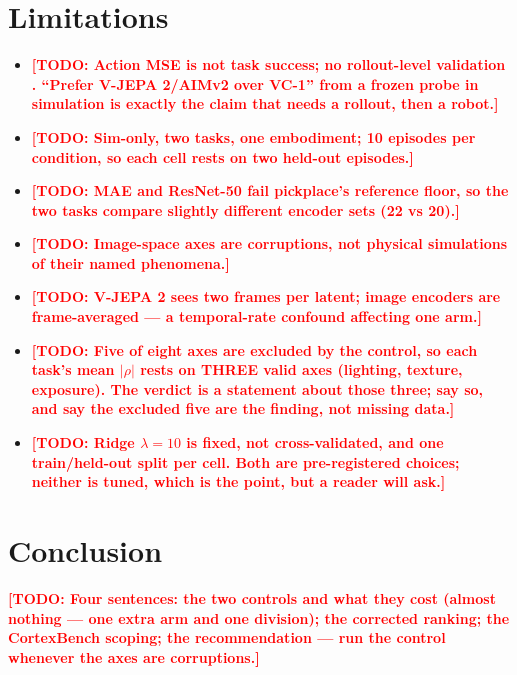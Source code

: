 \documentclass[10pt]{article}
\newcommand{\TODO}[1]{\textcolor{red}{\textbf{[TODO: #1]}}}
\newcommand{\rrho}{\rho}
\begin{document}
\section{Limitations}
\label{sec:limitations}
\begin{itemize}
  \item \TODO{Action MSE is not task success; no rollout-level validation
  \citep{criticalmse2026}. ``Prefer V-JEPA 2/AIMv2 over VC-1'' from a frozen
  probe in simulation is exactly the claim that needs a rollout, then a
  robot.}
  \item \TODO{Sim-only, two tasks, one embodiment; 10 episodes per condition,
  so each cell rests on two held-out episodes.}
  \item \TODO{MAE and ResNet-50 fail pickplace's reference floor, so the two
  tasks compare slightly different encoder sets (22 vs 20).}
  \item \TODO{Image-space axes are corruptions, not physical simulations of
  their named phenomena.}
  \item \TODO{V-JEPA 2 sees two frames per latent; image encoders are
  frame-averaged --- a temporal-rate confound affecting one arm.}
  \item \TODO{Five of eight axes are excluded by the control, so each task's
  mean $|\rrho|$ rests on THREE valid axes (lighting, texture, exposure). The
  verdict is a statement about those three; say so, and say the excluded
  five are the finding, not missing data.}
  \item \TODO{Ridge $\lambda{=}10$ is fixed, not cross-validated, and one
  train/held-out split per cell. Both are pre-registered choices; neither is
  tuned, which is the point, but a reader will ask.}
\end{itemize}

\section{Conclusion}
\label{sec:conclusion}
\TODO{Four sentences: the two controls and what they cost (almost nothing ---
one extra arm and one division); the corrected ranking; the CortexBench
scoping; the recommendation --- run the control whenever the axes are
corruptions.}

\end{document}
